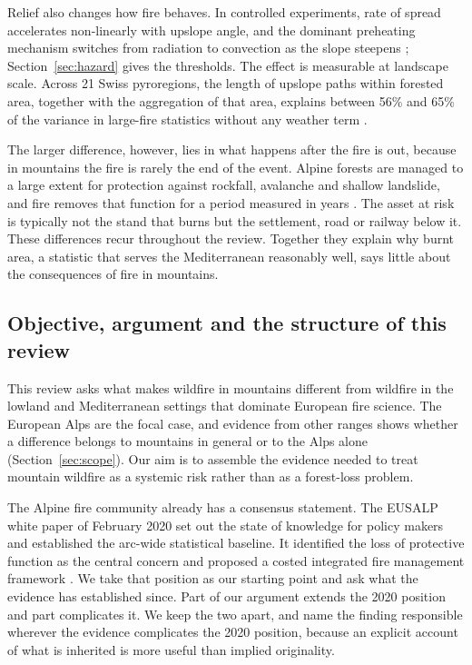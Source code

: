 \documentclass[11pt,a4paper]{article}
\begin{document}
Relief also changes how fire behaves. In controlled experiments, rate of spread accelerates non-linearly with upslope angle, and the dominant preheating mechanism switches from radiation to convection as the slope steepens \citep{hayajneh_wind_2026}; Section~\ref{sec:hazard} gives the thresholds. The effect is measurable at landscape scale. Across 21 Swiss pyroregions, the length of upslope paths within forested area, together with the aggregation of that area, explains between 56\% and 65\% of the variance in large-fire statistics without any weather term \citep{conedera_linking_2024}.

The larger difference, however, lies in what happens after the fire is out, because in mountains the fire is rarely the end of the event. Alpine forests are managed to a large extent for protection against rockfall, avalanche and shallow landslide, and fire removes that function for a period measured in years \citep{melzner_wildfire-induced_2025, melzner_brief_2019}. The asset at risk is typically not the stand that burns but the settlement, road or railway below it. These differences recur throughout the review. Together they explain why burnt area, a statistic that serves the Mediterranean reasonably well, says little about the consequences of fire in mountains.

\subsection{Objective, argument and the structure of this review}

This review asks what makes wildfire in mountains different from wildfire in the lowland and Mediterranean settings that dominate European fire science. The European Alps are the focal case, and evidence from other ranges shows whether a difference belongs to mountains in general or to the Alps alone (Section~\ref{sec:scope}). Our aim is to assemble the evidence needed to treat mountain wildfire as a systemic risk rather than as a forest-loss problem.

The Alpine fire community already has a consensus statement. The EUSALP white paper of February 2020 set out the state of knowledge for policy makers and established the arc-wide statistical baseline. It identified the loss of protective function as the central concern and proposed a costed integrated fire management framework \citep{muller_forest_2020}. We take that position as our starting point and ask what the evidence has established since. Part of our argument extends the 2020 position and part complicates it. We keep the two apart, and name the finding responsible wherever the evidence complicates the 2020 position, because an explicit account of what is inherited is more useful than implied originality.
\end{document}
